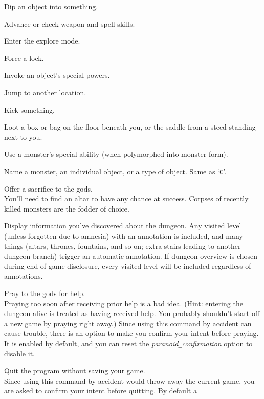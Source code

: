 Dip an object into something.
\item[\tb{\#enhance}]
Advance or check weapon and spell skills.
\item[\tb{\#exploremode}]
Enter the explore mode.
\item[\tb{\#force}]
Force a lock.
\item[\tb{\#invoke}]
Invoke an object's special powers.
\item[\tb{\#jump}]
Jump to another location.
\item[\tb{\#kick}]
Kick something.
\item[\tb{\#loot}]
Loot a box or bag on the floor beneath you, or the saddle 
from a steed standing next to you.
\item[\tb{\#monster}]
Use a monster's special ability (when polymorphed into monster form).
\item[\tb{\#name}]
Name a monster, an individual object, or a type of object.  Same as `{\tt C}'.
\item[\tb{\#offer}]
Offer a sacrifice to the gods.\\
You'll need to find an altar to have any chance at success.
Corpses of recently killed monsters are the fodder of choice.
\item[\tb{\#overview}]
Display information you've discovered about the dungeon.  Any visited
level (unless forgotten due to amnesia) with an annotation is included,
and many things (altars, thrones, fountains, and so on; extra stairs
leading to another dungeon branch) trigger an automatic annotation.
If dungeon overview is chosen during end-of-game disclosure, every visited
level will be included regardless of annotations.
\item[\tb{\#pray}]
Pray to the gods for help.\\
Praying too soon after receiving prior help is a bad idea.
(Hint: entering the dungeon alive is treated as having received help.
You probably shouldn't start off a new game by praying right away.)
Since using this command by accident can cause trouble, there is an
option to make you confirm your intent before praying.  It is enabled
by default, and you can reset the
{\it paranoid\verb+_+confirmation\/}
option to disable it.
\item[\tb{\#quit}]
Quit the program without saving your game.\\
Since using this command by accident would throw away the current game,
you are asked to confirm your intent before quitting.  By default a
